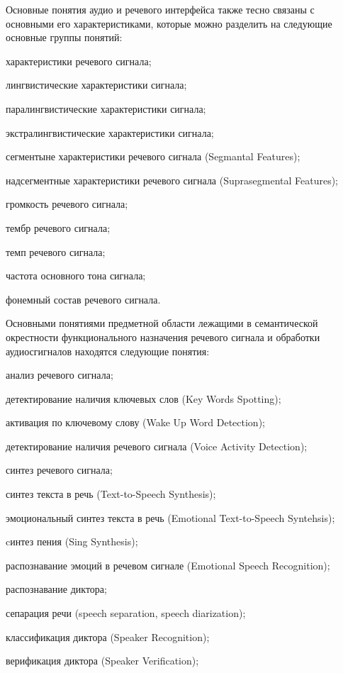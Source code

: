 Основные понятия аудио и речевого интерфейса также тесно связаны с основными его характеристиками, которые можно разделить на следующие основные группы понятий:
\begin{textitemize}
    \item характеристики речевого сигнала;
    \item лингвистические характеристики сигнала;
    \item паралингвистические характеристики сигнала;
    \item экстралингвистические характеристики сигнала;
    \item сегментыне характеристики речевого сигнала (Segmantal Features);
    \item надсегментные характеристики речевого сигнала (Suprasegmental Features);
    \item громкость речевого сигнала;
    \item тембр речевого сигнала;
    \item темп речевого сигнала;
    \item частота основного тона сигнала;
    \item фонемный состав речевого сигнала.
\end{textitemize}

Основными понятиями предметной области лежащими в семантической окрестности функционального назначения речевого сигнала  и обработки аудиосгигналов находятся следующие понятия:
\begin{textitemize}    
    \item анализ речевого сигнала;
    \item детектирование наличия ключевых слов (Key Words Spotting);
    \item активация по ключевому слову (Wake Up Word Detection);
    \item детектирование наличия речевого сигнала (Voice Activity Detection);
    \item синтез речевого сигнала;
    \item синтез текста в речь (Text-to-Speech Synthesis);
    \item эмоциональный синтез текста в речь (Emotional Text-to-Speech Syntehsis);
    \item cинтез пения (Sing Synthesis);
    \item распознавание эмоций в речевом сигнале (Emotional Speech Recognition);
    \item распознавание диктора;
    \item сепарация речи (speech separation, speech diarization);
    \item классификация диктора (Speaker Recognition);
    \item верификация диктора (Speaker Verification);
\end{textitemize}

